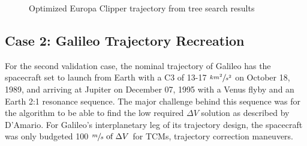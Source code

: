 \documentclass[letterpaper, preprint, paper,11pt]{AAS}	%
\newcommand*\circled[1]{\tikz[baseline=(char.base)]{
            \node[shape=circle,draw,inner sep=0.8pt] (char) {#1};}}
\begin{document}
\begin{figure}[h!tb]
    \centering
    \caption{Optimized Europa Clipper trajectory from tree search results}
    \label{fig:clipMalto}
\end{figure}
\subsection{Case 2: Galileo Trajectory Recreation}

For the second validation case, the nominal trajectory of Galileo has the spacecraft set to launch from Earth with a C3 of 13-17 $\sfrac{km^2}{s^2}$ on October 18, 1989, and arriving at Jupiter on December 07, 1995 with a Venus flyby and an Earth 2:1 resonance sequence. The major challenge behind this sequence was for the algorithm to be able to find the low required $\Delta V$ solution as described by D'Amario\cite{DAmario1992}. For Galileo's interplanetary leg of its trajectory design, the spacecraft was only budgeted 100 $\sfrac{m}{s} \text{ of } \Delta V$ for TCMs, trajectory correction maneuvers.
\end{document}
